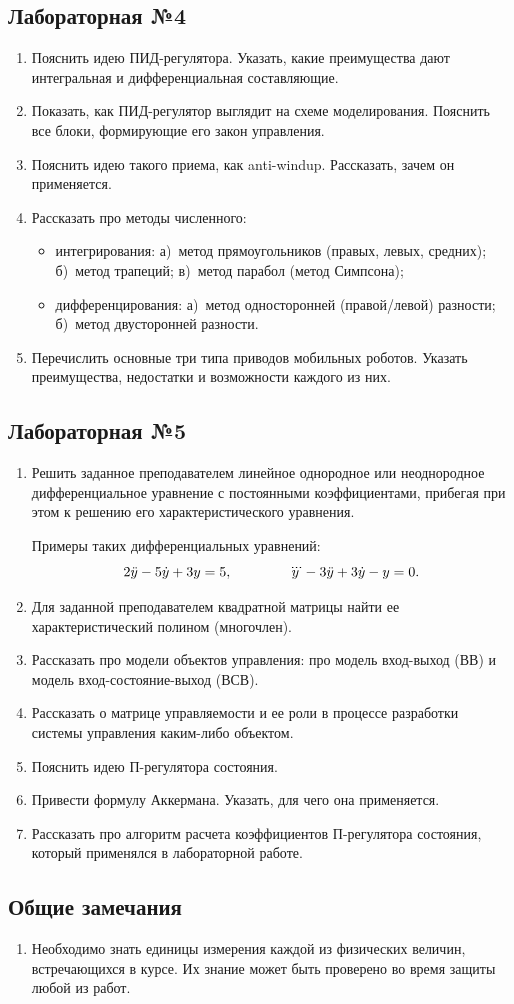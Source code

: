 \documentclass[12pt,a4paper]{article}
\begin{document}
\subsection*{Лабораторная №4}
\begin{enumerate}
\item Пояснить идею ПИД-регулятора. Указать, какие преимущества дают интегральная и дифференциальная составляющие.
\item Показать, как ПИД-регулятор выглядит на схеме моделирования. Пояснить все блоки, формирующие его закон управления.
\item Пояснить идею такого приема, как anti-windup. Рассказать, зачем он применяется.
\item Рассказать про методы численного:
\begin{itemize}
\item интегрирования:
а)~метод прямоугольников (правых, левых, средних);
б)~метод трапеций;
в)~метод парабол (метод Симпсона);
\item дифференцирования:
а)~метод односторонней (правой/левой) разности;
б)~метод двусторонней разности.
\end{itemize} 
\item Перечислить основные три типа приводов мобильных роботов. Указать преимущества, недостатки и возможности каждого из них.
\end{enumerate}

\subsection*{Лабораторная №5}
\begin{enumerate}
\item Решить заданное преподавателем линейное однородное или неоднородное дифференциальное уравнение с постоянными коэффициентами, прибегая при этом к решению его характеристического уравнения.

Примеры таких дифференциальных уравнений:
$$
2\ddot{y}-5\dot{y}+3y=5,\qquad\qquad \dddot y-3\ddot{y}+3\dot{y}-y=0\ldotp
$$
\item Для заданной преподавателем квадратной матрицы найти ее характеристический полином (многочлен).
\item Рассказать про модели объектов управления: про модель вход-выход (ВВ) и модель вход-состояние-выход (ВСВ).
\item Рассказать о матрице управляемости и ее роли в процессе разработки системы управления каким-либо объектом.
\item Пояснить идею П-регулятора состояния.
\item Привести формулу Аккермана. Указать, для чего она применяется.
\item Рассказать про алгоритм расчета коэффициентов П-регулятора состояния, который применялся в лабораторной работе.
\end{enumerate}

\subsection*{Общие замечания}
\begin{enumerate}
\item Необходимо знать единицы измерения каждой из физических величин, встречающихся в курсе. Их знание может быть проверено во время защиты любой из работ.
\end{enumerate}
\end{document}
